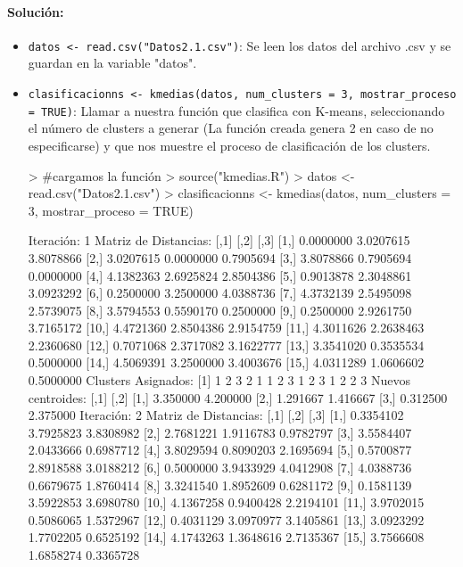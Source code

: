 \documentclass[a4paper, 12pt]{article}
\begin{document}
	\paragraph{Solución:}

	\begin{itemize}
		\item \texttt{datos <- read.csv("Datos2.1.csv")}: Se leen los datos del archivo .csv y se guardan en la variable "datos".
		\item \texttt{clasificacionns <- kmedias(datos, num\_clusters = 3, mostrar\_proceso = TRUE)}: Llamar a nuestra función que clasifica con K-means, seleccionando el número de clusters a generar (La función creada genera 2 en caso de no especificarse) y que nos muestre el proceso de clasificación de los clusters.
	
\begin{Schunk}
\begin{Sinput}
> #cargamos la función
> source("kmedias.R")
> datos <- read.csv("Datos2.1.csv")
> clasificacionns <- kmedias(datos, num_clusters = 3, mostrar_proceso = TRUE)
\end{Sinput}
\begin{Soutput}
Iteración:  1 
Matriz de Distancias:
           [,1]      [,2]      [,3]
 [1,] 0.0000000 3.0207615 3.8078866
 [2,] 3.0207615 0.0000000 0.7905694
 [3,] 3.8078866 0.7905694 0.0000000
 [4,] 4.1382363 2.6925824 2.8504386
 [5,] 0.9013878 2.3048861 3.0923292
 [6,] 0.2500000 3.2500000 4.0388736
 [7,] 4.3732139 2.5495098 2.5739075
 [8,] 3.5794553 0.5590170 0.2500000
 [9,] 0.2500000 2.9261750 3.7165172
[10,] 4.4721360 2.8504386 2.9154759
[11,] 4.3011626 2.2638463 2.2360680
[12,] 0.7071068 2.3717082 3.1622777
[13,] 3.3541020 0.3535534 0.5000000
[14,] 4.5069391 3.2500000 3.4003676
[15,] 4.0311289 1.0606602 0.5000000
Clusters Asignados:
 [1] 1 2 3 2 1 1 2 3 1 2 3 1 2 2 3
Nuevos centroides: 
         [,1]     [,2]
[1,] 3.350000 4.200000
[2,] 1.291667 1.416667
[3,] 0.312500 2.375000
Iteración:  2 
Matriz de Distancias:
           [,1]      [,2]      [,3]
 [1,] 0.3354102 3.7925823 3.8308982
 [2,] 2.7681221 1.9116783 0.9782797
 [3,] 3.5584407 2.0433666 0.6987712
 [4,] 3.8029594 0.8090203 2.1695694
 [5,] 0.5700877 2.8918588 3.0188212
 [6,] 0.5000000 3.9433929 4.0412908
 [7,] 4.0388736 0.6679675 1.8760414
 [8,] 3.3241540 1.8952609 0.6281172
 [9,] 0.1581139 3.5922853 3.6980780
[10,] 4.1367258 0.9400428 2.2194101
[11,] 3.9702015 0.5086065 1.5372967
[12,] 0.4031129 3.0970977 3.1405861
[13,] 3.0923292 1.7702205 0.6525192
[14,] 4.1743263 1.3648616 2.7135367
[15,] 3.7566608 1.6858274 0.3365728

\end{Soutput}
\end{Schunk}
\end{itemize}
\end{document}

